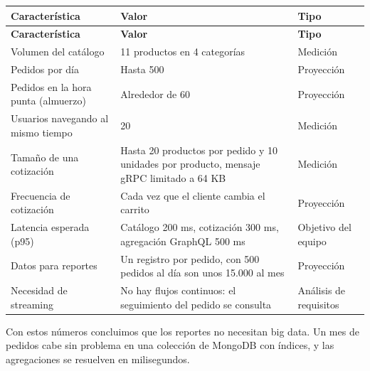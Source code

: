 \documentclass[10pt,letterpaper]{article}
\begin{document}
{\footnotesize
\begin{longtable}{|P{\tabcolsep\relax}|P{\tabcolsep\relax}|P{\tabcolsep\relax}|}
\hline
\textbf{Característica} & \textbf{Valor} & \textbf{Tipo} \\ \hline
\endfirsthead
\hline
\textbf{Característica} & \textbf{Valor} & \textbf{Tipo} \\ \hline
\endhead
Volumen del catálogo & 11 productos en 4 categorías & Medición  \\ \hline
Pedidos por día & Hasta 500 & Proyección \\ \hline
Pedidos en la hora punta (almuerzo) & Alrededor de 60 & Proyección \\ \hline
Usuarios navegando al mismo tiempo & 20 & Medición \\ \hline
Tamaño de una cotización & Hasta 20 productos por pedido y 10 unidades por producto, mensaje gRPC limitado a 64 KB & Medición  \\ \hline
Frecuencia de cotización & Cada vez que el cliente cambia el carrito & Proyección \\ \hline
Latencia esperada (p95) & Catálogo 200 ms, cotización 300 ms, agregación GraphQL 500 ms & Objetivo del equipo \\ \hline
Datos para reportes & Un registro por pedido, con 500 pedidos al día son unos 15.000 al mes & Proyección \\ \hline
Necesidad de streaming & No hay flujos continuos: el seguimiento del pedido se consulta & Análisis de requisitos \\ \hline
\end{longtable}}
Con estos números concluimos que los reportes no necesitan big data. Un mes de pedidos cabe sin problema en una colección de MongoDB con índices, y las agregaciones se resuelven en milisegundos.
\end{document}
